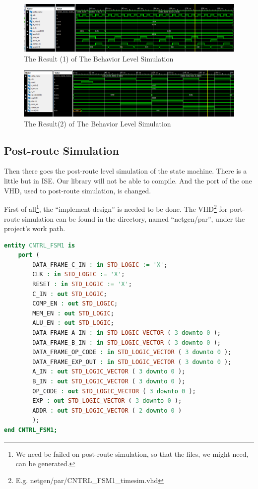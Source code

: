 \documentclass{article}
\begin{document}
\begin{figure}[h!]
\centering
\includegraphics[width=1\linewidth]{homework7-1}
\caption{The Result (1) of The Behavior Level Simulation}
\label{fig:homework7-1}
\end{figure}
\begin{figure}
\centering
\includegraphics[width=1\linewidth]{homework7-2}
\caption{The Result(2) of The Behavior Level Simulation}
\label{fig:homework7-2}
\end{figure}

    \subsection{Post-route Simulation}

    Then there goes the post-route level simulation of the state machine.
    There is a little but in ISE. Our library will not be able to compile.
    And the port of the one VHD, used to post-route simulation, is changed.
    
    
    First of all\footnote{We need be failed on post-route simulation, so that the files, we might need, can be generated.},
    the ``implement design'' is needed to be done.
    The VHD\footnote{E.g. netgen/par/CNTRL\_FSM1\_timesim.vhd} for port-route simulation can be found in the directory,
    named ``netgen/par'', under the project's work path.
    
    
    \begin{lstlisting}[language=VHDL,caption=One Version of The Entity for Post-route Simulation]
entity CNTRL_FSM1 is
    port (
        DATA_FRAME_C_IN : in STD_LOGIC := 'X'; 
        CLK : in STD_LOGIC := 'X'; 
        RESET : in STD_LOGIC := 'X'; 
        C_IN : out STD_LOGIC; 
        COMP_EN : out STD_LOGIC; 
        MEM_EN : out STD_LOGIC; 
        ALU_EN : out STD_LOGIC; 
        DATA_FRAME_A_IN : in STD_LOGIC_VECTOR ( 3 downto 0 ); 
        DATA_FRAME_B_IN : in STD_LOGIC_VECTOR ( 3 downto 0 ); 
        DATA_FRAME_OP_CODE : in STD_LOGIC_VECTOR ( 3 downto 0 ); 
        DATA_FRAME_EXP_OUT : in STD_LOGIC_VECTOR ( 3 downto 0 ); 
        A_IN : out STD_LOGIC_VECTOR ( 3 downto 0 ); 
        B_IN : out STD_LOGIC_VECTOR ( 3 downto 0 ); 
        OP_CODE : out STD_LOGIC_VECTOR ( 3 downto 0 ); 
        EXP : out STD_LOGIC_VECTOR ( 3 downto 0 ); 
        ADDR : out STD_LOGIC_VECTOR ( 2 downto 0 ) 
        );
end CNTRL_FSM1;
    \end{lstlisting}
    
\end{document}
